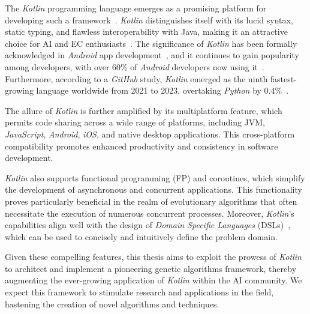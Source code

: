   The \textit{Kotlin} programming language emerges as a promising platform for 
  developing such a framework~\autocite{KotlinProgrammingLanguagea}.
  \textit{Kotlin} distinguishes itself with its lucid syntax, static typing, and 
  flawless interoperability with Java, making it an attractive choice for AI and
  EC enthusiasts~\autocite{CallingJavaKotlin,CallingKotlinJava,KotlinJavaInteropGuide}.
  The significance of \textit{Kotlin} has been formally acknowledged in 
  \textit{Android} app development~\autocite{AndroidKotlinfirstApproach}, and it
  continues to gain popularity among developers, with over 60\% of 
  \textit{Android} developers now using it~\autocite{LatestProgrammingLanguages2023}.
  Furthermore, according to a \textit{GitHub} study, \textit{Kotlin} emerged as 
  the ninth fastest-growing language worldwide from 2021 to 2023, overtaking 
  \textit{Python} by 0.4\%~\autocite{TopProgrammingLanguages}.

  The allure of \textit{Kotlin} is further amplified by its multiplatform 
  feature, which permits code sharing across a wide range of platforms, 
  including JVM, \textit{JavaScript}, \textit{Android}, \textit{iOS}, and native 
  desktop applications.
  This cross-platform compatibility promotes enhanced productivity and 
  consistency in software development.

  \textit{Kotlin} also supports functional programming (FP) and coroutines, 
  which simplify the development of asynchronous and concurrent applications.
  This functionality proves particularly beneficial in the realm of evolutionary 
  algorithms that often necessitate the execution of numerous concurrent 
  processes.
  Moreover, \textit{Kotlin}'s capabilities align well with the design of 
  \textit{Domain Specific Languages} (DSLs)~\autocite{TypesafeBuildersKotlin}, 
  which can be used to concisely and intuitively define the problem domain.

  Given these compelling features, this thesis aims to exploit the prowess of 
  \textit{Kotlin} to architect and implement a pioneering genetic algorithms 
  framework, thereby augmenting the ever-growing application of \textit{Kotlin} 
  within the AI community.
  We expect this framework to stimulate research and applications in the field, 
  hastening the creation of novel algorithms and techniques.
